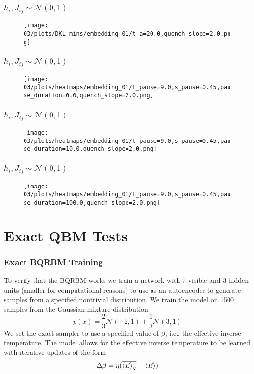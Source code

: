\documentclass{beamer}
\begin{document}
\begin{frame}
    \frametitle{\( h_i, J_{ij} \sim \mathcal{N}(0, 1) \)}
    \begin{figure}
        \texttt{[image: 03/plots/DKL\_mins/embedding\_01/t\_a=20.0,quench\_slope=2.0.png]}
    \end{figure}
\end{frame}
\begin{frame}
    \frametitle{\( h_i, J_{ij} \sim \mathcal{N}(0, 1) \)}
    \begin{figure}
        \texttt{[image: 03/plots/heatmaps/embedding\_01/t\_pause=9.0,s\_pause=0.45,pause\_duration=0.0,quench\_slope=2.0.png]}
    \end{figure}
\end{frame}
\begin{frame}
    \frametitle{\( h_i, J_{ij} \sim \mathcal{N}(0, 1) \)}
    \begin{figure}
        \texttt{[image: 03/plots/heatmaps/embedding\_01/t\_pause=9.0,s\_pause=0.45,pause\_duration=10.0,quench\_slope=2.0.png]}
    \end{figure}
\end{frame}
\begin{frame}
    \frametitle{\( h_i, J_{ij} \sim \mathcal{N}(0, 1) \)}
    \begin{figure}
        \texttt{[image: 03/plots/heatmaps/embedding\_01/t\_pause=9.0,s\_pause=0.45,pause\_duration=100.0,quench\_slope=2.0.png]}
    \end{figure}
\end{frame}


\section{Exact QBM Tests}
\begin{frame}
    \frametitle{Exact BQRBM Training}
    To verify that the BQRBM works we train a network with 7 visible and 3 hidden units (smaller for computational reasons) to use as an autoencoder to generate samples from a specified nontrivial distribution.
    We train the model on 1500 samples from the Gaussian mixture distribution
    \[
        p(x) = \frac{2}{3} \mathcal{N}(-2, 1) + \frac{1}{3} \mathcal{N}(3, 1)
    \]
    We set the exact sampler to use a specified value of \( \beta \), i.e., the effective inverse temperature.
    The model allows for the effective inverse temperature to be learned with iterative updates of the form
    \[
        \Delta\beta = \eta (\overline{\braket{E}_{\mathbf{v}}} - \braket{E})
    \]
\end{frame}
\end{document}
